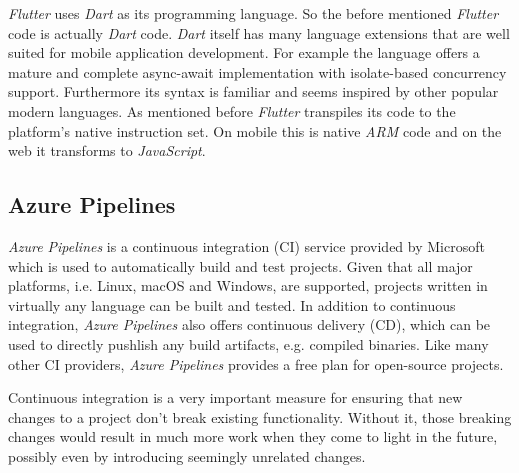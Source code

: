 \textit{Flutter} uses \textit{Dart} as its programming language. So the before mentioned \textit{Flutter}
code is actually \textit{Dart} code. \textit{Dart} itself has many language extensions that are well
suited for mobile application development. For example the language offers a mature and complete
async-await implementation with isolate-based concurrency support. Furthermore its syntax is
familiar and seems inspired by other popular modern languages. As mentioned before \textit{Flutter}
transpiles its code to the platform's native instruction set. On mobile this is native \textit{ARM}
code and on the web it transforms to \textit{JavaScript}. \cite{dart}

\subsection{Azure Pipelines}

\textit{Azure Pipelines} is a continuous integration (CI) service provided by Microsoft which is
used to automatically build and test projects. Given that all major platforms, i.e. Linux, macOS and
Windows, are supported, projects written in virtually any language can be built and tested. In
addition to continuous integration, \textit{Azure Pipelines} also offers continuous delivery (CD),
which can be used to directly pushlish any build artifacts, e.g. compiled binaries. Like many other
CI providers, \textit{Azure Pipelines} provides a free plan for open-source projects.
\cite{azure-pipelines}

Continuous integration is a very important measure for ensuring that new changes to a project don't
break existing functionality. Without it, those breaking changes would result in much more work when
they come to light in the future, possibly even by introducing seemingly unrelated changes.
